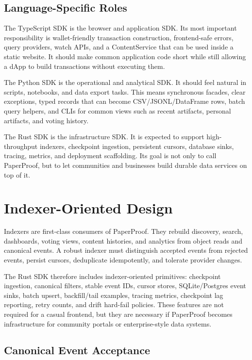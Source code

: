 \documentclass[journal]{IEEEtran}
\begin{document}
\subsection{Language-Specific Roles}

The TypeScript SDK is the browser and application SDK. Its most important responsibility is wallet-friendly transaction construction, frontend-safe errors, query providers, watch APIs, and a ContentService that can be used inside a static website. It should make common application code short while still allowing a dApp to build transactions without executing them.

The Python SDK is the operational and analytical SDK. It should feel natural in scripts, notebooks, and data export tasks. This means synchronous facades, clear exceptions, typed records that can become CSV/JSONL/DataFrame rows, batch query helpers, and CLIs for common views such as recent artifacts, personal artifacts, and voting history.

The Rust SDK is the infrastructure SDK. It is expected to support high-throughput indexers, checkpoint ingestion, persistent cursors, database sinks, tracing, metrics, and deployment scaffolding. Its goal is not only to call PaperProof, but to let communities and businesses build durable data services on top of it.

\section{Indexer-Oriented Design}

Indexers are first-class consumers of PaperProof. They rebuild discovery, search, dashboards, voting views, content histories, and analytics from object reads and canonical events. A robust indexer must distinguish accepted events from rejected events, persist cursors, deduplicate idempotently, and tolerate provider changes.

The Rust SDK therefore includes indexer-oriented primitives: checkpoint ingestion, canonical filters, stable event IDs, cursor stores, SQLite/Postgres event sinks, batch upsert, backfill/tail examples, tracing metrics, checkpoint lag reporting, retry counts, and drift hard-fail policies. These features are not required for a casual frontend, but they are necessary if PaperProof becomes infrastructure for community portals or enterprise-style data systems.

\subsection{Canonical Event Acceptance}
\end{document}
